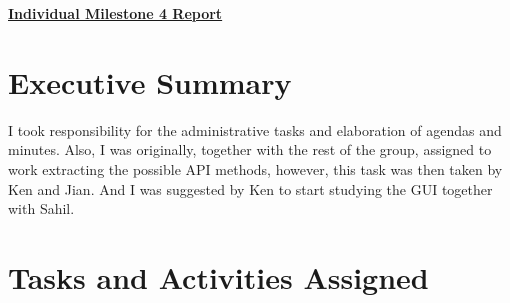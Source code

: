 \documentclass{article}
\begin{document}
\pagestyle{headings}

\begin{center}
{\LARGE\textbf{\underline{{Individual Milestone 4 Report}}}}
\end{center}

\section*{Executive Summary}

I took responsibility for the administrative tasks and elaboration of agendas and minutes.  Also, I was originally, together with the rest of the group, assigned to work extracting the possible API methods, however, this task was then taken by Ken and Jian.  And I was suggested by Ken to start studying the GUI together with Sahil.

\section*{Tasks and Activities Assigned}
\end{document}
